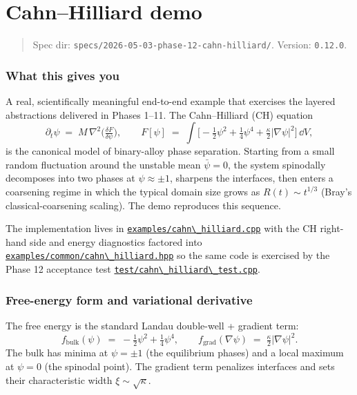 \chapter{Cahn--Hilliard demo}
\label{chap:cahn-hilliard}

\begin{quote}
Spec dir:
\passthrough{\lstinline!specs/2026-05-03-phase-12-cahn-hilliard/!}.
Version: \passthrough{\lstinline!0.12.0!}.
\end{quote}

\subsection{What this gives you}\label{phase12-what}

A real, scientifically meaningful end-to-end example that exercises
the layered abstractions delivered in Phases 1--11. The Cahn--Hilliard
(CH) equation
\[
\partial_t\psi \;=\; M\,\nabla^2\!\Big(\tfrac{\delta F}{\delta \psi}\Big),
\qquad
F[\psi] \;=\; \int\!\Big[-\tfrac12\psi^2 + \tfrac14\psi^4 + \tfrac{\kappa}{2}|\nabla\psi|^2\Big]\,\dd V,
\]
is the canonical model of binary-alloy phase separation. Starting from
a small random fluctuation around the unstable mean \(\bar\psi=0\), the
system spinodally decomposes into two phases at \(\psi\approx\pm 1\),
sharpens the interfaces, then enters a coarsening regime in which the
typical domain size grows as \(R(t)\sim t^{1/3}\) (Bray's
classical-coarsening scaling). The demo reproduces this sequence.

The implementation lives in
\href{../../../examples/cahn_hilliard.cpp}{\passthrough{\lstinline!examples/cahn\_hilliard.cpp!}}
with the CH right-hand side and energy diagnostics factored into
\href{../../../examples/common/cahn_hilliard.hpp}{\passthrough{\lstinline!examples/common/cahn\_hilliard.hpp!}}
so the same code is exercised by the Phase 12 acceptance test
\href{../../../test/cahn_hilliard_test.cpp}{\passthrough{\lstinline!test/cahn\_hilliard\_test.cpp!}}.

\subsection{Free-energy form and variational
derivative}\label{phase12-energy}

The free energy is the standard Landau double-well + gradient term:
\[
f_{\text{bulk}}(\psi) \;=\; -\tfrac12\psi^2 + \tfrac14\psi^4,
\qquad
f_{\text{grad}}(\nabla\psi) \;=\; \tfrac{\kappa}{2}|\nabla\psi|^2.
\]
The bulk has minima at \(\psi=\pm 1\) (the equilibrium phases) and a
local maximum at \(\psi=0\) (the spinodal point). The gradient term
penalizes interfaces and sets their characteristic width
\(\xi\sim\sqrt{\kappa}\).

